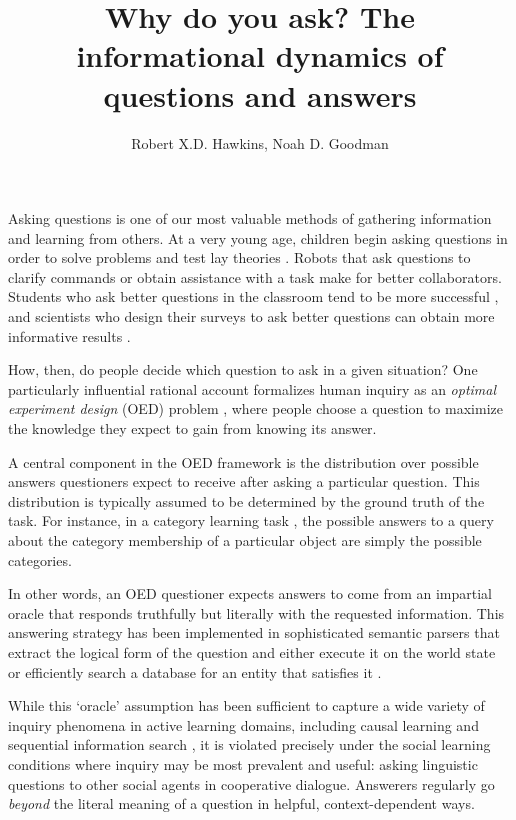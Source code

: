 \documentclass[11pt, floatsintext]{apa6}
\title{Why do you ask? The informational dynamics of questions and answers}
\author{Robert X.D. Hawkins, Noah D. Goodman}
\affiliation{Stanford University}
\begin{document}
\maketitle
Asking questions is one of our most valuable methods of gathering information and learning from others. 
At a very young age, children begin asking questions in order to solve problems and test lay theories \cite{LegareEtAl13_QuestionsChildhood, Chouinard07_ChildrenQuestions,CallananOakes92_PreschoolerQuestions}. 
Robots that ask questions to clarify commands \cite{DeitsTellex___Roy13_HumanRobotDialog} or obtain assistance with a task \cite{FongThorpeBaur03_RobotQuestions} make for better collaborators. 
Students who ask better questions in the classroom tend to be more successful \cite{GraesserPerson94_QuestionAskingTutoring}, and scientists who design their surveys to ask better questions can obtain more informative results \cite{ClarkSchober92_InfluencingAnswers}.

How, then, do people decide which question to ask in a given situation?
One particularly influential rational account formalizes human inquiry as an \emph{optimal experiment design} (OED) problem \cite{OaksfordChater94_RationalAnalysisSelectionTask,Nelson05_UsefulQuestions,MyungPitt09_OED, GureckisMarkant12_SelfDirectedLearning,coenen2018asking}, where people choose a question to maximize the knowledge they expect to gain from knowing its answer. 

A central component in the OED framework is the distribution over possible answers questioners expect to receive after asking a particular question.
This distribution is typically assumed to be determined by the ground truth of the task. 
For instance, in a category learning task \cite{MarkantGureckis14_ActiveLearning}, the possible answers to a query about the category membership of a particular object are simply the possible categories.

In other words, an OED questioner expects answers to come from an impartial oracle that responds truthfully but literally with the requested information.
This answering strategy has been implemented in sophisticated semantic parsers that extract the logical form of the question and either execute it on the world state or efficiently search a database for an entity that satisfies it \cite{rothe2017question}.

While this `oracle' assumption has been sufficient to capture a wide variety of inquiry phenomena in active learning domains, including causal learning \cite{bramley2015conservative} and sequential information search \cite{RuggeriLombrozo15_ChildrenAdaptQuestions}, it is violated precisely under the social learning conditions where inquiry may be most prevalent and useful: asking linguistic questions to other social agents in cooperative dialogue.
Answerers regularly go \emph{beyond} the literal meaning of a question in helpful, context-dependent ways.
\end{document}
